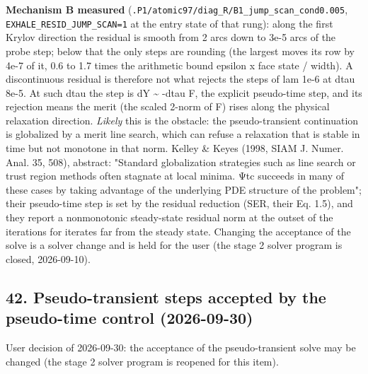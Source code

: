 \documentclass[english,a4paper]{my_memo}
\begin{document}
\textbf{Mechanism B measured} (\texttt{.P1/atomic97/diag\_R/B1\_jump\_scan\_cond0.005},
\texttt{EXHALE\_RESID\_JUMP\_SCAN=1} at the entry state of that rung): along the first
Krylov direction the residual is smooth from 2 arcs down to 3e-5 arcs of the
probe step; below that the only steps are rounding (the largest moves its
row by 4e-7 of it, 0.6 to 1.7 times the arithmetic bound epsilon x face state
/ width). A discontinuous residual is therefore not what rejects the steps
of lam 1e-6 at dtau 8e-5. At such dtau the step is dY \textasciitilde{} -dtau F, the explicit
pseudo-time step, and its rejection means the merit (the scaled 2-norm of F)
rises along the physical relaxation direction. \emph{Likely} this is the
obstacle: the pseudo-transient continuation is globalized by a merit line
search, which can refuse a relaxation that is stable in time but not
monotone in that norm. Kelley \& Keyes (1998, SIAM J. Numer. Anal. 35, 508),
abstract: "Standard globalization strategies such as line search or trust
region methods often stagnate at local minima. Ψtc succeeds in many of these
cases by taking advantage of the underlying PDE structure of the problem";
their pseudo-time step is set by the residual reduction (SER, their Eq. 1.5),
and they report a nonmonotonic steady-state residual norm at the outset of
the iterations for iterates far from the steady state. Changing the acceptance
of the solve is a solver change and is held for the user (the stage 2 solver
program is closed, 2026-09-10).

\subsection{42. Pseudo-transient steps accepted by the pseudo-time control (2026-09-30)}\label{42-pseudo-transient-steps-accepted-by-the-pseudo-time-control-2026-09-30}

User decision of 2026-09-30: the acceptance of the pseudo-transient solve
may be changed (the stage 2 solver program is reopened for this item).
\end{document}
